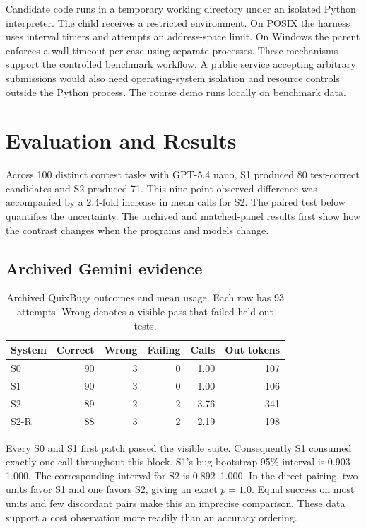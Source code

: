 \documentclass[conference]{IEEEtran}
\begin{document}
Candidate code runs in a temporary working directory under an isolated Python interpreter. The child receives a restricted environment. On POSIX the harness uses interval timers and attempts an address-space limit. On Windows the parent enforces a wall timeout per case using separate processes. These mechanisms support the controlled benchmark workflow. A public service accepting arbitrary submissions would also need operating-system isolation and resource controls outside the Python process. The course demo runs locally on benchmark data.

\section{Evaluation and Results}
Across 100 distinct contest tasks with GPT-5.4 nano, S1 produced 80 test-correct candidates and S2 produced 71. This nine-point observed difference was accompanied by a 2.4-fold increase in mean calls for S2. The paired test below quantifies the uncertainty. The archived and matched-panel results first show how the contrast changes when the programs and models change.
\subsection{Archived Gemini evidence}
\begin{table}[ht]
\caption{Archived QuixBugs outcomes and mean usage. Each row has 93 attempts. Wrong denotes a visible pass that failed held-out tests.}
\centering\footnotesize
\begin{tabular}{lrrrrr}\toprule
System & Correct & Wrong & Failing & Calls & Out tokens\\\midrule
S0 &90&3&0&1.00&107\\
S1 &90&3&0&1.00&106\\
S2 &89&2&2&3.76&341\\
S2-R &88&3&2&2.19&198\\\bottomrule
\end{tabular}
\end{table}
Every S0 and S1 first patch passed the visible suite. Consequently S1 consumed exactly one call throughout this block. S1's bug-bootstrap 95\% interval is 0.903--1.000. The corresponding interval for S2 is 0.892--1.000. In the direct pairing, two units favor S1 and one favors S2, giving an exact $p=1.0$. Equal success on most units and few discordant pairs make this an imprecise comparison. These data support a cost observation more readily than an accuracy ordering.
\end{document}
